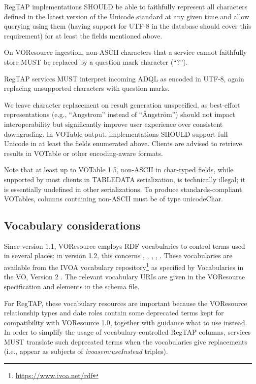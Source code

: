 \documentclass[11pt,a4paper]{ivoa}
\begin{document}
RegTAP implementations SHOULD be able to faithfully represent all
characters defined in the latest version of the Unicode standard
\citep{std:UNICODE} at
any given time and allow querying using them (having support for UTF-8
in the database should cover this requirement) for at least the fields
mentioned above.

On VOResource ingestion, non-ASCII characters that a service cannot
faithfully store MUST be replaced by a question mark character (``?'').

RegTAP services MUST interpret incoming ADQL as encoded in UTF-8,
again replacing unsupported characters with question marks.

We leave character replacement on result generation unspecified, as
best-effort representations (e.g., ``Angstrom'' instead of ``Ångström'')
should not impact interoperability but significantly improve user
experience over consistent downgrading.  In VOTable output,
implementations SHOULD support full Unicode in at least the fields
enumerated above.  Clients are advised to retrieve results in VOTable or
other encoding-aware formats.

Note that at least up to VOTable 1.5, non-ASCII in char-typed fields, while
supported by most clients in TABLEDATA serialization, is technically
illegal; it is essentially undefined in other serializations.  To
produce standards-compliant VOTables, columns containing non-ASCII must
be of type unicodeChar.

\subsection{Vocabulary considerations}

\label{sect:vocab-use}

Since version 1.1, VOResource employs RDF vocabularies to control terms
used in several places; in version 1.2, this concerns
, ,
,
, .
These vocabularies are available from the IVOA vocabulary
repository\footnote{\url{https://www.ivoa.net/rdf}} as specified by
Vocabularies in the VO, Version 2 \citep{2023ivoa.spec.0206D}.  The
relevant vocabulary URIs are given in the VOResource specification and
 elements in the schema file.

For RegTAP, these vocabulary resources are important because the
VOResource relationship types and date roles contain some deprecated
terms kept for compatibility with VOResource 1.0, together with guidance
what to use instead.  In order to simplify the usage of
vocabulary-controlled RegTAP columns, services MUST translate such deprecated
terms when the vocabularies give replacements (i.e., appear as subjects
of \emph{ivoasem:useInstead} triples).
\end{document}
